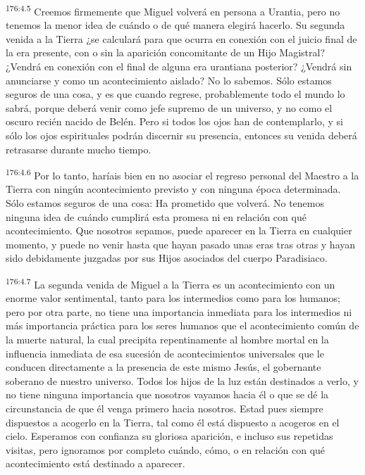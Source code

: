 \par
\textsuperscript{176:4.5} Creemos firmemente que Miguel volverá en persona a Urantia, pero no tenemos la menor idea de cuándo o de qué manera elegirá hacerlo. Su segunda venida a la Tierra ¿se calculará para que ocurra en conexión con el juicio final de la era presente, con o sin la aparición concomitante de un Hijo Magistral? ¿Vendrá en conexión con el final de alguna era urantiana posterior? ¿Vendrá sin anunciarse y como un acontecimiento aislado? No lo sabemos. Sólo estamos seguros de una cosa, y es que cuando regrese, probablemente todo el mundo lo sabrá, porque deberá venir como jefe supremo de un universo, y no como el oscuro recién nacido de Belén. Pero si todos los ojos han de contemplarlo, y si sólo los ojos espirituales podrán discernir su presencia, entonces su venida deberá retrasarse durante mucho tiempo.

\par
\textsuperscript{176:4.6} Por lo tanto, haríais bien en no asociar el regreso personal del Maestro a la Tierra con ningún acontecimiento previsto y con ninguna época determinada. Sólo estamos seguros de una cosa: Ha prometido que volverá. No tenemos ninguna idea de cuándo cumplirá esta promesa ni en relación con qué acontecimiento. Que nosotros sepamos, puede aparecer en la Tierra en cualquier momento, y puede no venir hasta que hayan pasado unas eras tras otras y hayan sido debidamente juzgadas por sus Hijos asociados del cuerpo Paradisiaco.

\par
\textsuperscript{176:4.7} La segunda venida de Miguel a la Tierra es un acontecimiento con un enorme valor sentimental, tanto para los intermedios como para los humanos; pero por otra parte, no tiene una importancia inmediata para los intermedios ni más importancia práctica para los seres humanos que el acontecimiento común de la muerte natural, la cual precipita repentinamente al hombre mortal en la influencia inmediata de esa sucesión de acontecimientos universales que le conducen directamente a la presencia de este mismo Jesús, el gobernante soberano de nuestro universo. Todos los hijos de la luz están destinados a verlo, y no tiene ninguna importancia que nosotros vayamos hacia él o que se dé la circunstancia de que él venga primero hacia nosotros. Estad pues siempre dispuestos a acogerlo en la Tierra, tal como él está dispuesto a acogeros en el cielo. Esperamos con confianza su gloriosa aparición, e incluso sus repetidas visitas, pero ignoramos por completo cuándo, cómo, o en relación con qué acontecimiento está destinado a aparecer.